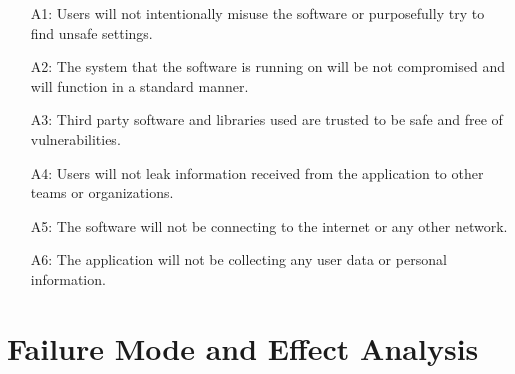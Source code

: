 \documentclass{article}
\begin{document}
\begin{itemize}
    \item [A1:] Users will not intentionally misuse the software or purposefully try to find unsafe settings.
    \item [A2:] The system that the software is running on will be not compromised and will function in a standard manner.
    \item [A3:] Third party software and libraries used are trusted to be safe and free of vulnerabilities.
    \item [A4:] Users will not leak information received from the application to other teams or organizations. 
    \item [A5:] The software will not be connecting to the internet or any other network.
    \item [A6:] The application will not be collecting any user data or personal information.
\end{itemize}


\section{Failure Mode and Effect Analysis}
\end{document}
